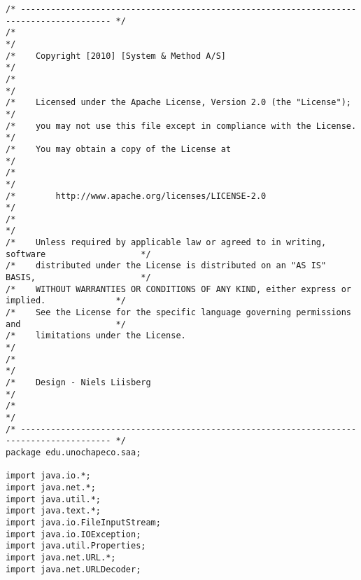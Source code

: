 \begin{lstlisting}
/* ---------------------------------------------------------------------------------------- */
/*                                                                                          */
/*    Copyright [2010] [System & Method A/S]                                                */
/*                                                                                          */
/*    Licensed under the Apache License, Version 2.0 (the "License");                       */
/*    you may not use this file except in compliance with the License.                      */
/*    You may obtain a copy of the License at                                               */
/*                                                                                          */
/*        http://www.apache.org/licenses/LICENSE-2.0                                        */
/*                                                                                          */
/*    Unless required by applicable law or agreed to in writing, software                   */
/*    distributed under the License is distributed on an "AS IS" BASIS,                     */
/*    WITHOUT WARRANTIES OR CONDITIONS OF ANY KIND, either express or implied.              */
/*    See the License for the specific language governing permissions and                   */
/*    limitations under the License.                                                        */
/*                                                                                          */
/*    Design - Niels Liisberg                                                               */
/*                                                                                          */
/* ---------------------------------------------------------------------------------------- */
package edu.unochapeco.saa;

import java.io.*;
import java.net.*;
import java.util.*;
import java.text.*;
import java.io.FileInputStream;
import java.io.IOException;
import java.util.Properties;
import java.net.URL.*;
import java.net.URLDecoder;


\end{lstlisting}
